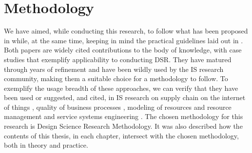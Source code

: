 \section{Methodology}
\label{chap:methods}

We have aimed, while conducting this research, to follow what has been proposed in \cite{peffers_design_2007} while, at the same time, keeping in mind the practical guidelines laid out in \cite{hevner_design_2004}. Both papers are widely cited contributions to the body of knowledge, with case studies that exemplify applicability to conducting DSR. They have matured through years of refinement and have been wildly used by the IS research community, making them a suitable choice for a methodology to follow. To exemplify the usage breadth of these approaches, we can verify that they have been used or suggested, and cited, in IS research on supply chain on the internet of things \cite{geerts_supply_2014}, quality of business processes \cite{heidari_quality_2014}, modeling of resources and resource management \cite{speitkamp_mathematical_2010} and service systems engineering \cite{bohmann_service_2014}. The chosen methodology for this research is Design Science Research Methodology. It was also described how the contents of this thesis, in each chapter, intersect with the chosen methodology, both in theory and practice.